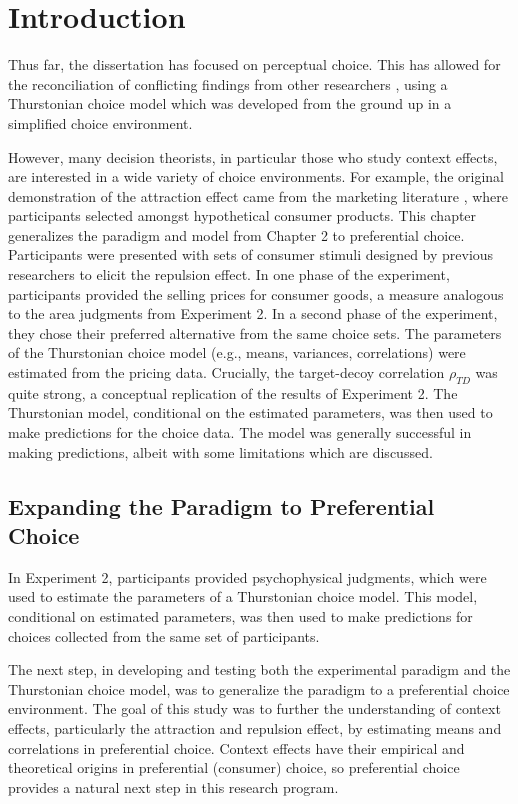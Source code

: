\section{Introduction}
Thus far, the dissertation has focused on perceptual choice. This has allowed for the reconciliation of conflicting findings from other researchers \parencite{spektorWhenGoodLooks2018b,trueblood2013not}, using a Thurstonian choice model which was developed from the ground up in a simplified choice environment.

However, many decision theorists, in particular those who study context effects, are interested in a wide variety of choice environments. For example, the original demonstration of the attraction effect came from the marketing literature \parencite{huberAddingAsymmetricallyDominated1982d}, where participants selected amongst hypothetical consumer products. This chapter generalizes the paradigm and model from Chapter 2 to preferential choice. Participants were presented with sets of consumer stimuli designed by previous researchers to elicit the repulsion effect. In one phase of the experiment, participants provided the selling prices for consumer goods, a measure analogous to the area judgments from Experiment 2. In a second phase of the experiment, they chose their preferred alternative from the same choice sets. The parameters of the Thurstonian choice model (e.g., means, variances, correlations) were estimated from the pricing data. Crucially, the target-decoy correlation $\rho_{TD}$ was quite strong, a conceptual replication of the results of Experiment 2. The Thurstonian model, conditional on the estimated parameters, was then used to make predictions for the choice data. The model was generally successful in making predictions, albeit with some limitations which are discussed. 

\subsection{Expanding the Paradigm to Preferential Choice}

In Experiment 2, participants provided psychophysical judgments, which were used to estimate the parameters of a Thurstonian choice model. This model, conditional on estimated parameters, was then used to make predictions for choices collected from the same set of participants. 

The next step, in developing and testing both the experimental paradigm and the Thurstonian choice model, was to generalize the paradigm to a preferential choice environment. The goal of this study was to further the understanding of context effects, particularly the attraction and repulsion effect, by estimating means and correlations in preferential choice. Context effects have their empirical and theoretical origins in preferential (consumer) choice, so preferential choice provides a natural next step in this research program.

